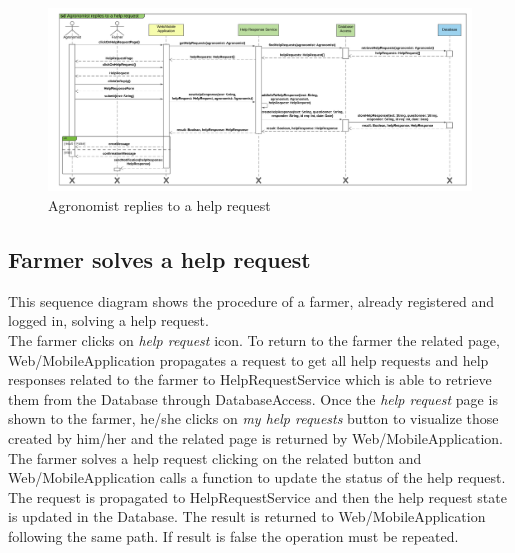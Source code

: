 \newpage
\begin{landscape}
\begin{figure}[h]
\vspace*{-2cm}
\noindent
\centering
\centerline{\includegraphics[scale= 0.108]{./Images/Sequence diagram/Agronomist replies to a help request.png}}
    \caption{Agronomist replies to a help request}
    \vspace*{-12cm}
\end{figure}
\fillandplacepagenumber
\end{landscape}

\subsection{Farmer solves a help request}

This sequence diagram shows the procedure of a farmer, already registered and logged in, solving a help request.\\
The farmer clicks on \textit{help request} icon. To return to the farmer the related page, Web/MobileApplication propagates a request to get all help requests and help responses related to the farmer to HelpRequestService which is able to retrieve them from the Database through DatabaseAccess. 
Once the \textit{help request} page is shown to the farmer, he/she clicks on \textit{my help requests} button to visualize those created by him/her and the related page is returned by Web/MobileApplication. The farmer solves a help request clicking on the related button and Web/MobileApplication calls a function to update the status of the help request. The request is propagated to HelpRequestService and then the help request state is updated in the Database. The result is returned to Web/MobileApplication following the same path. If result is false the operation must be repeated.


